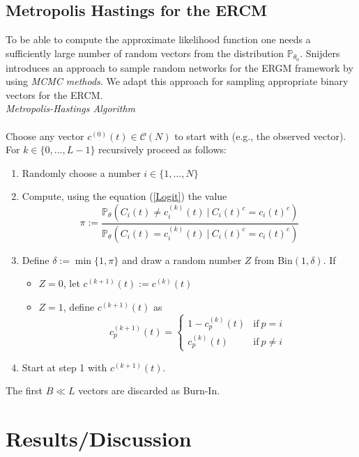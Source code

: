 \documentclass[headsepline=true, abstracton]{scrartcl}
\begin{document}
\subsection*{Metropolis Hastings for the ERCM}\label{networksimulation}
To be able to compute the approximate likelihood function one needs a sufficiently large number of random vectors from the distribution $\mathbb{P}_{\theta_0}$. Snijders \cite{Snijders.2002b} introduces an approach to sample random networks for the ERGM framework by using \textit{MCMC methods}. We adapt this approach for sampling appropriate binary vectors for the ERCM. \\[0.4cm]
\textit{Metropolis-Hastings Algorithm}\\\\
Choose any vector $c^{(0)}(t) \in \mathcal{C}(N)$ to start with (e.g., the observed vector). For $k \in \{0,...,L-1\}$ recursively proceed as follows:\\
\begin{enumerate}
\item Randomly choose a number $i\in \{1,\dots, N\}$
\item Compute, using the equation (\ref{Logit}) the value
$$\pi := \dfrac{\mathbb{P}_{\theta}(C_{i}(t) \neq c_{i}^{(k)}(t) ~| ~C_i(t)^c=c_i(t)^c)}{\mathbb{P}_{\theta}(C_{i}(t) = c_{i}^{(k)}(t) ~| ~C_i(t)^c=c_i(t)^c)}$$
\item Define $\delta:= \min\{1, \pi\}$ and draw a random number $Z$ from Bin$(1, \delta)$. If
\begin{itemize}
\item $Z=0$, let $c^{(k+1)}(t) := c^{(k)}(t)$ 
\item $Z=1$, define $c^{(k+1)}(t)$ as
$$c_{p}^{(k+1)}(t)=\begin{cases}
1-c_{p}^{(k)}(t)& \text{if}~ p=i \\
c_{p}^{(k)}(t) &\text{if}~ p \neq i 
\end{cases}$$
\end{itemize}
\item Start at step 1 with $c^{(k+1)}(t)$.
\end{enumerate}
The first $B \ll L$ vectors are discarded as Burn-In.


 \section*{Results/Discussion}


   
\newpage


 

\end{document}
